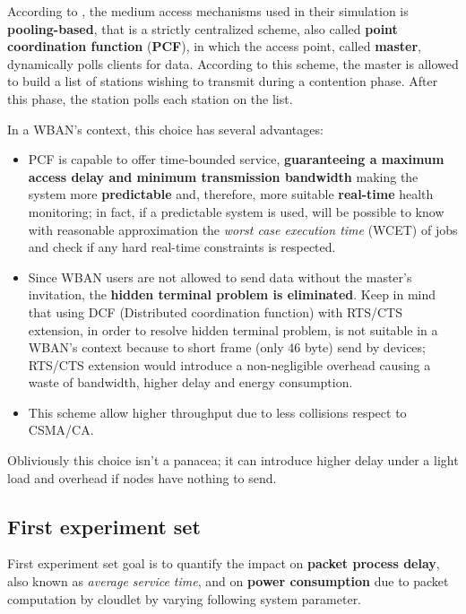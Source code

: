\documentclass[sigchi]{acmart}
\begin{document}
According to \citet{MSAReport}, the medium access mechanisms used in their simulation is \textbf{pooling-based}, that is a strictly centralized scheme, also called \textbf{point coordination function} (\textbf{PCF}), in which the access point, called \textbf{master}, dynamically polls clients for data. According to this scheme, the master is allowed to build a list of stations wishing to transmit during a contention phase. After this phase, the station polls each station on the list.

In a WBAN's context, this choice has several advantages:

\begin{itemize}

\item PCF is capable to offer time-bounded service, \textbf{guaranteeing a maximum access delay and minimum transmission bandwidth} making the system more \textbf{predictable} and, therefore, more suitable \textbf{real-time} health monitoring; in fact, if a predictable system is used, will be possible to know with reasonable approximation the \textit{worst case execution time} (WCET) of jobs and check if any hard real-time constraints is respected.

\item Since WBAN users are not allowed to send data without the master's invitation, the \textbf{hidden terminal problem is eliminated}. Keep in mind that using DCF (Distributed coordination function) with RTS/CTS extension, in order to resolve hidden terminal problem, is not suitable in a WBAN's context because to short frame (only 46 byte) send by devices; RTS/CTS extension would introduce a non-negligible overhead causing a waste of bandwidth, higher delay and energy consumption.

\item This scheme allow higher throughput due to less collisions respect to CSMA/CA.

\end{itemize}

Obliviously this choice isn't a panacea; it can introduce higher delay under a light load and overhead if nodes have nothing to send.

\subsection{First experiment set}

First experiment set goal is to quantify the impact on \textbf{packet process delay}, also known as \textit{average service time}, and on \textbf{power consumption} due to packet computation by cloudlet by varying following system parameter.
\end{document}
